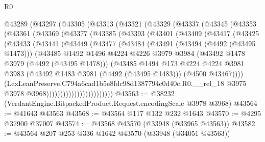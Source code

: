 \begin{lexlean}{R0}
\begin{coremodule}
    @43289
      (@43297
        (@43305
          (@43313
            (@43321
              (@43329
                (@43337
                  (@43345
                    (@43353
                      (@43361
                        (@43369
                          (@43377
                            (@43385
                              (@43393
                                (@43401
                                  (@43409
                                    (@43417
                                      (@43425
                                        (@43433
                                          (@43441
                                            (@43449
                                              (@43477
                                                (@43484
                                                  (@43491
                                                    (@43494 (@4492 (@43495 @1473)))
                                                    (@43485
                                                      @1492
                                                      @1496
                                                      @4224
                                                      @4226
                                                      @3979
                                                      @3984
                                                      (@43492 @1478 @3979 (@4492 (@43495 @1478)))
                                                      (@43485
                                                        @1494
                                                        @173
                                                        @4224
                                                        @4224
                                                        @3981
                                                        @3983
                                                        (@43492 @1483 @3981 (@4492 (@43495 @1483)))
                                                        (@4500 @43467))))
                                                  (LexLeanPreserve.C794a6cad1b5e8fdc98d1387794c0d40c.R0.__rel_18
                                                    @3975
                                                    @3978
                                                    @3968))))))))))))))))))))))))
@43563 := @38232 (VerdantEngine.BitpackedProduct.Request.encodingScale @3978 @3968)
@43564 := @41643 @43563
@43568 := @43564 @117 @132 @232 @1643
@43570 := @4295 @37900 @37007
@43574 := @43568 @43570 (@33948 (@33965 @43563))
@43582 := @43564 @207 @253 @336 @1642 @43570 (@33948 (@34051 @43563))

\end{coremodule}
\end{lexlean}
